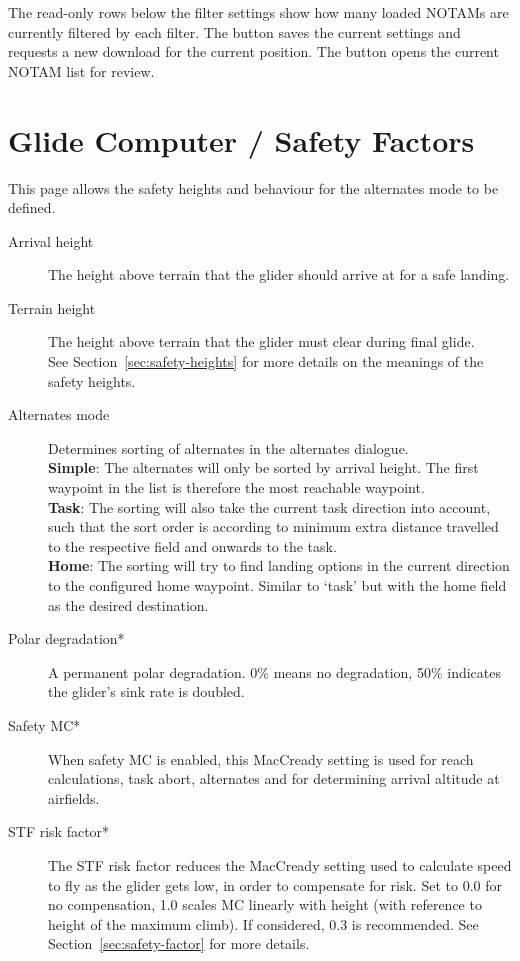 The read-only rows below the filter settings show how many loaded NOTAMs
are currently filtered by each filter.  The  button saves
the current settings and requests a new download for the current
position.  The  button opens the current NOTAM list for
review.


\section{Glide Computer / Safety Factors}\label{sec:safety-factors}

This page allows the safety heights and behaviour for the alternates mode to be defined.

\begin{description}
\item[Arrival height]  \label{conf:safetyarrival} The height above terrain that the glider
  should arrive at for a safe landing.
\item[Terrain height]  \label{conf:safetyterrain} The height above terrain that 
  the glider must clear during final glide. \\
See Section~\ref{sec:safety-heights} for more details on the meanings
of the safety heights. \\
\item[Alternates mode]  \label{conf:alternatesmode} Determines sorting of alternates 
  in the alternates dialogue. \\
  {\bf Simple}: The alternates will only be sorted by arrival height. 
    The first waypoint in the list is therefore the most reachable waypoint. \\
  {\bf Task}: The sorting will also take the current task direction into account, 
    such that the sort order is according to minimum extra distance travelled to 
    the respective field and onwards to the task. \\
  {\bf Home}: The sorting will try to find landing options in the current direction 
    to the configured home waypoint.  Similar to `task' but with 
    the home field as the desired destination.
\item[Polar degradation*]  A permanent polar degradation. 0\% means no degradation, 
  50\% indicates the glider's sink rate is doubled.
\item[Safety MC*]  When safety MC is enabled, this MacCready setting is used for reach 
  calculations, task abort, alternates and for determining arrival altitude at airfields.\label{conf:safetyMC} 
\item[STF risk factor*] 
  The STF risk factor reduces the MacCready setting used to calculate
  speed to fly as the glider gets low, in order to compensate for
  risk.  Set to 0.0 for no compensation, 1.0 scales MC linearly with
  height (with reference to height of the maximum climb). If considered, 0.3 is recommended.  
  See Section~\ref{sec:safety-factor} for more details.
\end{description}


